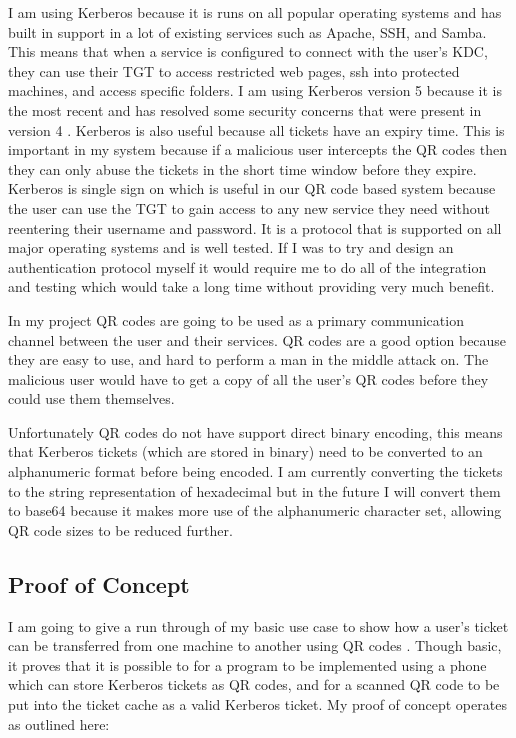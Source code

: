 \documentclass[]{report}   %
\begin{document}
I am using Kerberos because it is runs on all popular operating systems and has built in support in a lot of existing services such as Apache, SSH, and Samba. This means that when a service is configured to connect with the user's KDC, they can use their TGT to access restricted web pages, ssh into protected machines, and access specific folders. I am using Kerberos version 5 because it is the most recent and has resolved some security concerns that were present in version 4 \cite{KerbUpdate}. Kerberos is also useful because all tickets have an expiry time. This is important in my system because if a malicious user intercepts the QR codes then they can only abuse the tickets in the short time window before they expire. Kerberos is single sign on which is useful in our QR code based system because the user can use the TGT to gain access to any new service they need without reentering their username and password. It is a protocol that is supported on all major operating systems and is well tested. If I was to try and design an authentication protocol myself it would require me to do all of the integration and testing which would take a long time without providing very much benefit.

In my project QR codes are going to be used as a primary communication channel between the user and their services. QR codes are a good option because they are easy to use, and hard to perform a man in the middle attack on. The malicious user would have to get a copy of all the user's QR codes before they could use them themselves.

Unfortunately QR codes do not have support direct binary encoding, this means that Kerberos tickets (which are stored in binary) need to be converted to an alphanumeric format before being encoded. I am currently converting the tickets to the string representation of hexadecimal but in the future I will convert them to base64 because it makes more use of the alphanumeric character set, allowing QR code sizes to be reduced further.

\subsection{Proof of Concept} 
I am going to give a run through of my basic use case to show how a user’s ticket can be transferred from one machine to another using QR codes \cite{YouTubeDemo}. Though basic, it proves that it is possible to for a program to be implemented using a phone which can store Kerberos tickets as QR codes, and for a scanned QR code to be put into the ticket cache as a valid Kerberos ticket. My proof of concept operates as outlined here:
\end{document}
